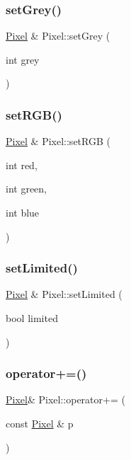 \mbox{\label{class_pixel_af37bcc9005e4e4ec116da879a9669d9d}} 
\subsubsection{\texorpdfstring{setGrey()}{setGrey()}}
{\footnotesize\ttfamily \mbox{\hyperlink{class_pixel}{Pixel}} \& Pixel\+::set\+Grey (\begin{DoxyParamCaption}\item[{int}]{grey }\end{DoxyParamCaption})}

\mbox{\label{class_pixel_a953bc04f4ab0ec1ec2b89a2be8859578}} 
\subsubsection{\texorpdfstring{setRGB()}{setRGB()}}
{\footnotesize\ttfamily \mbox{\hyperlink{class_pixel}{Pixel}} \& Pixel\+::set\+R\+GB (\begin{DoxyParamCaption}\item[{int}]{red,  }\item[{int}]{green,  }\item[{int}]{blue }\end{DoxyParamCaption})}

\mbox{\label{class_pixel_a21fcbb0bfec7e485750e41da09737f28}} 
\subsubsection{\texorpdfstring{setLimited()}{setLimited()}}
{\footnotesize\ttfamily \mbox{\hyperlink{class_pixel}{Pixel}} \& Pixel\+::set\+Limited (\begin{DoxyParamCaption}\item[{bool}]{limited }\end{DoxyParamCaption})}

\mbox{\label{class_pixel_a2d175c56e5761b25bb6a6606ec09b4fa}} 
\subsubsection{\texorpdfstring{operator+=()}{operator+=()}}
{\footnotesize\ttfamily \mbox{\hyperlink{class_pixel}{Pixel}}\& Pixel\+::operator+= (\begin{DoxyParamCaption}\item[{const \mbox{\hyperlink{class_pixel}{Pixel}} \&}]{p }\end{DoxyParamCaption})\hspace{0.3cm}{\ttfamily [inline]}}

